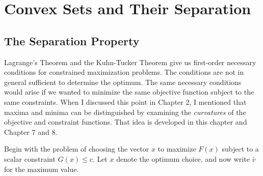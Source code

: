 \chapter{Convex Sets and Their Separation}

\section*{The Separation Property}

Lagrange's Theorem and the Kuhn-Tucker Theorem give us first-order necessary conditions for constrained maximization problems. The conditions are not in general sufficient to determine the optimum. The same necessary conditions would arise if we wanted to minimize the same objective function subject to the same constraints. When I discussed this point in Chapter 2, I mentioned that maxima and minima can be distinguished by examining the \textit{curvatures} of the objective and constraint functions. That idea is developed in this chapter and Chapter 7 and 8.

Begin with the problem of choosing the vector $x$ to maximize $F(x)$ subject to a scalar constraint $G(x) \leq c$. Let $x$ denote the optimum choice, and now write $\bar{v}$ for the maximum value.

